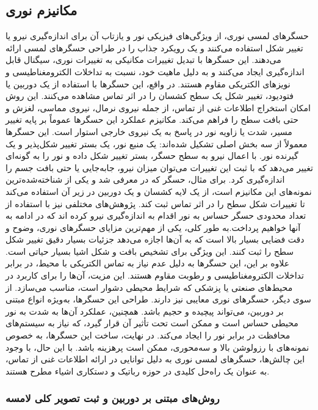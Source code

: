 \subsection{مکانیزم نوری}
حسگرهای لمسی نوری، از ویژگی‌های فیزیکی نور و یازتاب آن برای اندازه‌گیری نیرو یا تغییر شکل استفاده می‌کنند و یک رویکرد جذاب را در طراحی حسگرهای لمسی ارائه می‌دهند. این حسگرها با تبدیل تغییرات مکانیکی به تغییرات نوری، سیگنال قابل اندازه‌گیری ایجاد می‌کنند و به دلیل ماهیت خود، نسبت به تداخلات الکترومغناطیسی و نویزهای الکتریکی مقاوم هستند. در واقع، این حسگرها با استفاده از یک دوربین یا فتودیود، تغییر شکل یک سطح کشسان را در اثر تماس مشاهده می‌کنند. این روش امکان استخراج اطلاعات غنی از تماس، از جمله نیروی نرمال، نیروی مماسی، لغزش و حتی بافت سطح را فراهم می‌کند.
مکانیزم عملکرد این حسگرها عموماً بر پایه تغییر مسیر، شدت یا زاویه نور در پاسخ به یک نیروی خارجی استوار است. این حسگرها معمولاً از سه بخش اصلی تشکیل شده‌اند: یک منبع نور، یک بستر تغییر شکل‌پذیر و یک گیرنده نور. با اعمال نیرو به سطح حسگر، بستر تغییر شکل داده و نور را به گونه‌ای تغییر می‌دهد که با ثبت این تغییرات می‌توان میزان نیرو، جابه‌جایی یا حتی بافت جسم را اندازه‌گیری کرد. برای مثال، حسگر 
 که در 
\cite{yuan2017gelsight}
 معرفی شد و یکی از شناخته‌شده‌ترین نمونه‌های این مکانیزم است، از یک لایه کشسان و یک دوربین در زیر آن استفاده می‌کند تا تغییرات شکل سطح را در اثر تماس ثبت کند. پژوهش‌های مختلفی نیز با استفاده از تعداد محدودی حسگر حساس به نور اقدام به اندازه‌گیری نیرو کرده اند که در ادامه به آنها خواهیم پرداخت.به طور کلی، یکی از مهم‌ترین مزایای حسگرهای نوری، وضوح و دقت فضایی بسیار بالا است که به آن‌ها اجازه می‌دهد جزئیات بسیار دقیق تغییر شکل سطح را ثبت کنند. این ویژگی برای تشخیص بافت و شکل اشیا بسیار حیاتی است. علاوه بر این، این حسگرها به دلیل عدم نیاز به تماس الکتریکی با محیط، در برابر تداخلات الکترومغناطیسی و رطوبت مقاوم هستند. این مزیت، آن‌ها را برای کاربرد در محیط‌های صنعتی یا پزشکی که شرایط محیطی دشوار است، مناسب می‌سازد. از سوی دیگر، حسگرهای نوری معایبی نیز دارند. طراحی این حسگرها، به‌ویژه انواع مبتنی بر دوربین، می‌تواند پیچیده و حجیم باشد. همچنین، عملکرد آن‌ها به شدت به نور محیطی حساس است و ممکن است تحت تأثیر آن قرار گیرد، که نیاز به سیستم‌های محافظت در برابر نور را ایجاد می‌کند. در نهایت، ساخت این حسگرها، به خصوص نمونه‌های با رزولوشن بالا و سه‌محوری، ممکن است پرهزینه باشد. با این حال، با وجود این چالش‌ها، حسگرهای لمسی نوری به دلیل توانایی در ارائه اطلاعات غنی از تماس، به عنوان یک راه‌حل کلیدی در حوزه رباتیک و دستکاری اشیاء مطرح هستند.
\subsubsection{روش‌های مبتنی بر دوربین و ثبت تصویر کلی لامسه}

